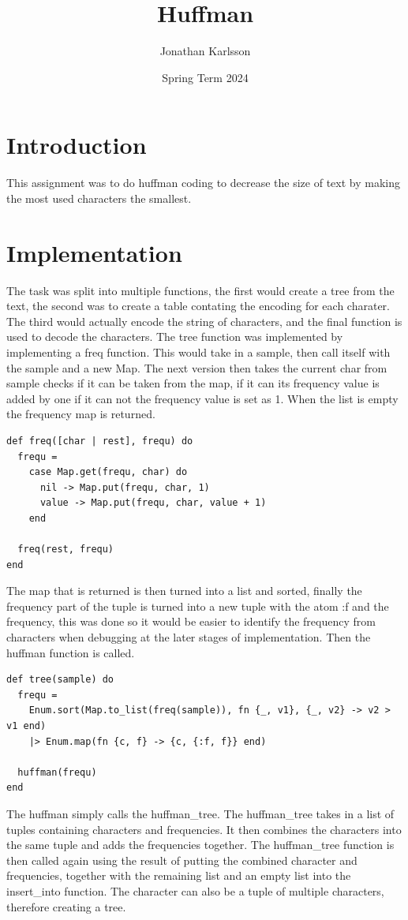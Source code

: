 \documentclass[a4paper,11pt]{article}
\begin{document}
\title{
    \textbf{Huffman}
}
\author{Jonathan Karlsson}
\date{Spring Term 2024}

\maketitle

\section*{Introduction}
This assignment was to do huffman coding to decrease the size of text by making the most used characters the smallest.

\section*{Implementation}
The task was split into multiple functions, the first would create a tree from the text, the second was to create a table contating the encoding for each charater. The third would actually encode the string of characters, and the final function is used to decode the characters.
The tree function was implemented by implementing a freq function. This would take in a sample, then call itself with the sample and a new Map. The next version then takes the current char from sample checks if it can be taken from the map, if it can its frequency value is added by one if it can not the frequency value is set as 1. When the list is empty the frequency map is returned. 
\begin{verbatim}
def freq([char | rest], frequ) do
  frequ =
    case Map.get(frequ, char) do
      nil -> Map.put(frequ, char, 1)
      value -> Map.put(frequ, char, value + 1)
    end

  freq(rest, frequ)
end
\end{verbatim}
The map that is returned is then turned into a list and sorted, finally the frequency part of the tuple is turned into a new tuple with the atom :f and the frequency, this was done so it would be easier to identify the frequency from characters when debugging at the later stages of implementation. 
Then the huffman function is called. 
\begin{verbatim}
def tree(sample) do
  frequ =
    Enum.sort(Map.to_list(freq(sample)), fn {_, v1}, {_, v2} -> v2 > v1 end)
    |> Enum.map(fn {c, f} -> {c, {:f, f}} end)

  huffman(frequ)
end 
\end{verbatim}
The huffman simply calls the huffman\_tree. The huffman\_tree takes in a list of tuples containing characters and frequencies. It then combines the characters into the same tuple and adds the frequencies together. The huffman\_tree function is then called again using the result of putting the combined character and frequencies, together with the remaining list and an empty list into the insert\_into function. The character can also be a tuple of multiple characters, therefore creating a tree. 
\end{document}
